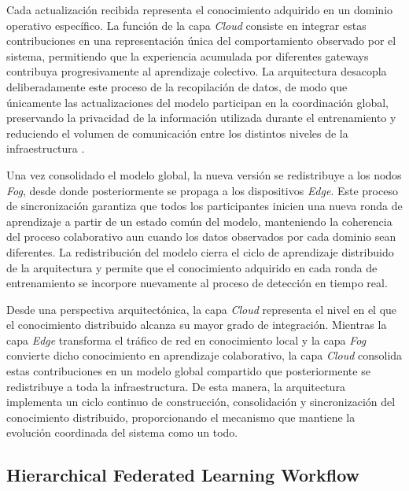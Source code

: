 \documentclass[journal,article,submit,moreauthors]{Definitions/mdpi}
\begin{document}
Cada actualización recibida representa el conocimiento adquirido en un dominio operativo específico. La función de la capa \textit{Cloud} consiste en integrar estas contribuciones en una representación única del comportamiento observado por el sistema, permitiendo que la experiencia acumulada por diferentes gateways contribuya progresivamente al aprendizaje colectivo. La arquitectura desacopla deliberadamente este proceso de la recopilación de datos, de modo que únicamente las actualizaciones del modelo participan en la coordinación global, preservando la privacidad de la información utilizada durante el entrenamiento y reduciendo el volumen de comunicación entre los distintos niveles de la infraestructura \cite{Hajj2023,Ficco2024}.
%

Una vez consolidado el modelo global, la nueva versión se redistribuye a los nodos \textit{Fog}, desde donde posteriormente se propaga a los dispositivos \textit{Edge}. Este proceso de sincronización garantiza que todos los participantes inicien una nueva ronda de aprendizaje a partir de un estado común del modelo, manteniendo la coherencia del proceso colaborativo aun cuando los datos observados por cada dominio sean diferentes. La redistribución del modelo cierra el ciclo de aprendizaje distribuido de la arquitectura y permite que el conocimiento adquirido en cada ronda de entrenamiento se incorpore nuevamente al proceso de detección en tiempo real.

Desde una perspectiva arquitectónica, la capa \textit{Cloud} representa el nivel en el que el conocimiento distribuido alcanza su mayor grado de integración. Mientras la capa \textit{Edge} transforma el tráfico de red en conocimiento local y la capa \textit{Fog} convierte dicho conocimiento en aprendizaje colaborativo, la capa \textit{Cloud} consolida estas contribuciones en un modelo global compartido que posteriormente se redistribuye a toda la infraestructura. De esta manera, la arquitectura implementa un ciclo continuo de construcción, consolidación y sincronización del conocimiento distribuido, proporcionando el mecanismo que mantiene la evolución coordinada del sistema como un todo.

\subsection{Hierarchical Federated Learning Workflow}
\end{document}
